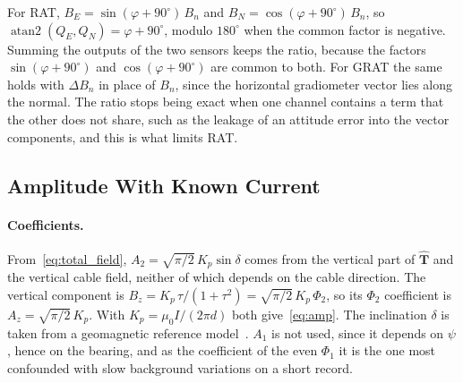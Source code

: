 For RAT, $B_E = \sin(\varphi + 90^\circ)\, B_n$ and $B_N = \cos(\varphi + 90^\circ)\, B_n$, so $\operatorname{atan2}(Q_E, Q_N) = \varphi + 90^\circ$, modulo $180^\circ$ when the common factor is negative. Summing the outputs of the two sensors keeps the ratio, because the factors $\sin(\varphi + 90^\circ)$ and $\cos(\varphi + 90^\circ)$ are common to both. For GRAT the same holds with $\Delta B_n$ in place of $B_n$, since the horizontal gradiometer vector lies along the normal. The ratio stops being exact when one channel contains a term that the other does not share, such as the leakage of an attitude error into the vector components, and this is what limits RAT.

\subsection{Amplitude With Known Current}\label{app:amp}

\paragraph{Coefficients.}
From~\eqref{eq:total_field}, $A_2 = \sqrt{\pi/2}\,K_p \sin\delta$ comes from the vertical part of $\hat{\mathbf{T}}$ and the vertical cable field, neither of which depends on the cable direction. The vertical component is $B_z = K_p\,\tau/(1 + \tau^2) = \sqrt{\pi/2}\,K_p\,\Phi_2$, so its $\Phi_2$ coefficient is $A_z = \sqrt{\pi/2}\,K_p$. With $K_p = \mu_0 I/(2\pi d)$ both give~\eqref{eq:amp}. The inclination $\delta$ is taken from a geomagnetic reference model~\cite{alken2021igrf}. $A_1$ is not used, since it depends on $\psi$, hence on the bearing, and as the coefficient of the even $\Phi_1$ it is the one most confounded with slow background variations on a short record.

